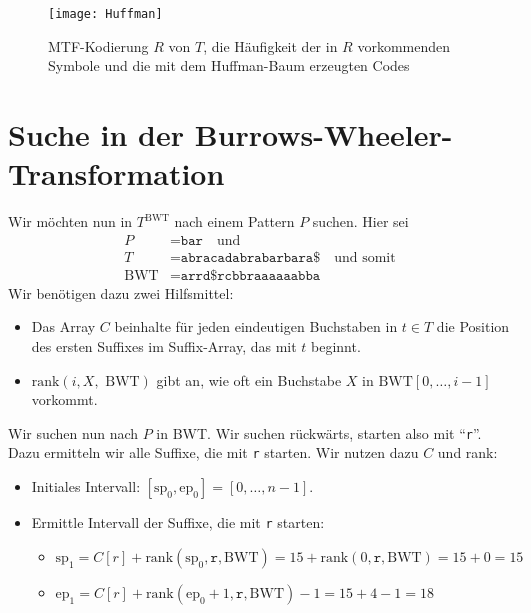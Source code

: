 \begin{figure}[H]
  \texttt{[image: Huffman]}
  \caption{MTF-Kodierung \( R \) von \( T \), die Häufigkeit der in \( R \) vorkommenden Symbole und die mit dem Huffman-Baum erzeugten Codes}
\end{figure}

\section{Suche in der Burrows-Wheeler-Transformation}

Wir möchten nun in \( T^{\text{BWT}} \) nach einem Pattern \( P \) suchen. Hier sei
\begin{align*}
  P &= \texttt{bar} \quad \text{und} \\
  T &= \texttt{abracadabrabarbara\$}\quad\text{und somit} \\
  \text{BWT} &= \texttt{arrd\$rcbbraaaaaabba}
\end{align*}
Wir benötigen dazu zwei Hilfsmittel:

\begin{itemize}
  \item Das Array \( C \) beinhalte für jeden eindeutigen Buchstaben in \( t \in T \) die Position des ersten Suffixes im Suffix-Array, das mit \( t \) beginnt.
  \item \( \text{rank}(i,X,\text{ BWT}) \) gibt an, wie oft ein Buchstabe \( X \) in \( \text{BWT}[0,\dots,i-1] \) vorkommt.
\end{itemize}

Wir suchen nun nach \( P \) in BWT. Wir suchen rückwärts, starten also mit ``\texttt{r}''. Dazu ermitteln wir alle Suffixe, die mit \texttt{r} starten. Wir nutzen dazu \( C \) und rank:

\begin{itemize}
  \item Initiales Intervall: \( [\text{sp}_0, \text{ep}_0] = [0,\dots,n-1] \).
  \item Ermittle Intervall der Suffixe, die mit \texttt{r} starten:
  \begin{itemize}
    \item \( \text{sp}_1 = C[r] + \text{rank}(\text{sp}_0, \texttt{r}, \text{BWT}) = 15 + \text{rank}(0,\texttt{r}, \text{BWT}) = 15+0 = 15 \)
    \item \( \text{ep}_1 = C[r] + \text{rank}(\text{ep}_0 + 1, \texttt{r}, \text{BWT}) - 1 = 15 + 4 - 1 = 18 \)
  \end{itemize}
\end{itemize}

